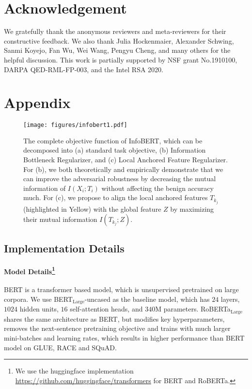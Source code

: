 \documentclass{article} \usepackage{iclr2021_conference,times}
\theoremstyle{definition}
\theoremstyle{remark}
\newcommand{\method}{InfoBERT\xspace}
\begin{document}
\section{Acknowledgement}
We gratefully thank the anonymous reviewers and meta-reviewers for their constructive feedback. We also thank Julia Hockenmaier, Alexander Schwing, Sanmi Koyejo, Fan Wu, Wei Wang, Pengyu Cheng, and many others for the helpful discussion.   This work is partially supported by NSF grant No.1910100, DARPA QED-RML-FP-003, and the Intel RSA 2020. 



\newpage
\appendix
\section{Appendix}

\begin{figure}[htp!]
    \centering
    \texttt{[image: figures/infobert1.pdf]}
    \caption{The complete objective function of \method, which can be decomposed into (a) standard task objective, (b) Information Bottleneck Regularizer, and (c) Local Anchored Feature Regularizer. For (b), we both theoretically and empirically demonstrate that we can improve the adversarial robustness by decreasing the mutual information of $I(X_i; T_i)$ without affecting the benign accuracy much. For (c), we propose to align the local anchored features $T_{k_j}$ (highlighted in Yellow) with the global feature $Z$ by maximizing their mutual information $I(T_{k_j}; Z)$. }
    \label{fig:overall}
\end{figure}

\subsection{Implementation Details} \label{ap:setup}


\paragraph[Model Details]{Model Details\footnote{We use the huggingface implementation  \url{https://github.com/huggingface/transformers} for BERT and RoBERTa.}}  BERT is a transformer \citep{DBLP:conf/nips/VaswaniSPUJGKP17} based model, which is unsupervised pretrained on large corpora. We use BERT$_\text{Large}$-uncased as the baseline model, which has $24$ layers,  $1024$ hidden units, $16$ self-attention heads, and $340$M parameters. RoBERTa$_\text{Large}$ shares the same architecture as BERT, but modifies key hyperparameters, removes the next-sentence pretraining objective and trains with much larger mini-batches and learning rates, which results in higher performance than BERT model on GLUE, RACE and SQuAD.
\end{document}
